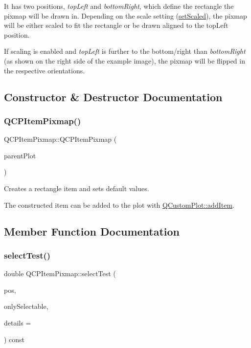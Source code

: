  It has two positions, {\itshape top\+Left} and {\itshape bottom\+Right}, which define the rectangle the pixmap will be drawn in. Depending on the scale setting (\hyperlink{class_q_c_p_item_pixmap_ab4d44529a1c6c8d37d0ea7560e042777}{set\+Scaled}), the pixmap will be either scaled to fit the rectangle or be drawn aligned to the top\+Left position.

If scaling is enabled and {\itshape top\+Left} is further to the bottom/right than {\itshape bottom\+Right} (as shown on the right side of the example image), the pixmap will be flipped in the respective orientations. 

\subsection{Constructor \& Destructor Documentation}
\hypertarget{class_q_c_p_item_pixmap_aa6de42a37261b21a5480e7da122345c3}{}\label{class_q_c_p_item_pixmap_aa6de42a37261b21a5480e7da122345c3} 
\subsubsection{\texorpdfstring{Q\+C\+P\+Item\+Pixmap()}{QCPItemPixmap()}}
{\footnotesize\ttfamily Q\+C\+P\+Item\+Pixmap\+::\+Q\+C\+P\+Item\+Pixmap (\begin{DoxyParamCaption}\item[{\hyperlink{class_q_custom_plot}{Q\+Custom\+Plot} $\ast$}]{parent\+Plot }\end{DoxyParamCaption})}

Creates a rectangle item and sets default values.

The constructed item can be added to the plot with \hyperlink{class_q_custom_plot_aa500620379262321685cb7a7674cbd2a}{Q\+Custom\+Plot\+::add\+Item}. 

\subsection{Member Function Documentation}
\hypertarget{class_q_c_p_item_pixmap_a7583a98ebd3f35d2ac5d6c05fad25a6c}{}\label{class_q_c_p_item_pixmap_a7583a98ebd3f35d2ac5d6c05fad25a6c} 
\subsubsection{\texorpdfstring{select\+Test()}{selectTest()}}
{\footnotesize\ttfamily double Q\+C\+P\+Item\+Pixmap\+::select\+Test (\begin{DoxyParamCaption}\item[{const Q\+PointF \&}]{pos,  }\item[{bool}]{only\+Selectable,  }\item[{Q\+Variant $\ast$}]{details = {} }\end{DoxyParamCaption}) const\hspace{0.3cm}{\ttfamily [virtual]}}


